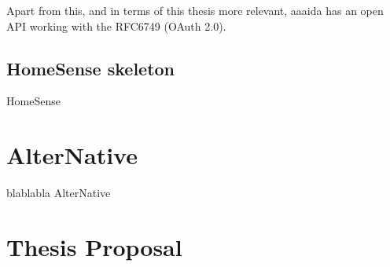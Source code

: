 Apart from this, and in terms of this thesis more relevant, aaaida has an open API working with the RFC6749 (OAuth 2.0).

\subsection{HomeSense skeleton}\label{SS:HomeSense-Skeleton}
HomeSense

\section{AlterNative}\label{S:AlterNative}
blablabla AlterNative

\section{Thesis Proposal}\label{S:IOSharp}
